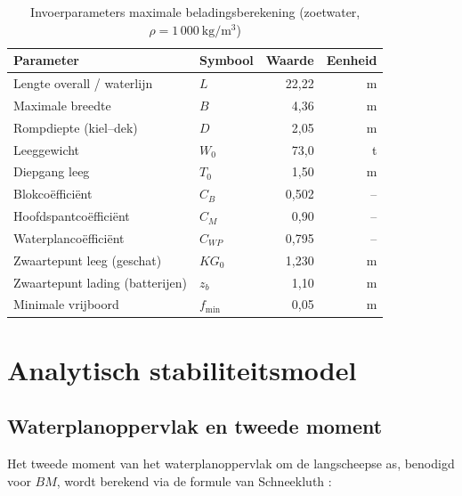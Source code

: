 \begin{table}[H]
    \centering
    \caption{Invoerparameters maximale beladingsberekening (zoetwater, $\rho = 1\,000\ \mathrm{kg/m^3}$)}
    \label{tab:invoer-maxbelading}
    \begin{tabular}{llrr}
        \toprule
        Parameter & Symbool & Waarde & Eenheid \\
        \midrule
        Lengte overall / waterlijn    & $L$                 & 22{,}22 & m    \\
        Maximale breedte              & $B$                 &  4{,}36 & m    \\
        Rompdiepte (kiel–dek)         & $D$                 &  2{,}05 & m    \\
        Leeggewicht                   & $W_0$               & 73{,}0  & t    \\
        Diepgang leeg                 & $T_0$               &  1{,}50 & m    \\
        Blokcoëfficiënt               & $C_B$               &  0{,}502& –    \\
        Hoofdspantcoëfficiënt         & $C_M$               &  0{,}90 & –    \\
        Waterplancoëfficiënt          & $C_{WP}$            &  0{,}795& –    \\
        Zwaartepunt leeg (geschat)    & $KG_0$              &  1{,}230& m    \\
        Zwaartepunt lading (batterijen)& $z_b$              &  1{,}10 & m    \\
        Minimale vrijboord            & $f_\mathrm{min}$    &  0{,}05 & m    \\
        \bottomrule
    \end{tabular}
\end{table}
 
\section{Analytisch stabiliteitsmodel}
\label{sec:analytisch-model}
 
\subsection{Waterplanoppervlak en tweede moment}
 
Het tweede moment van het waterplanoppervlak om de langscheepse as, benodigd voor $BM$,
wordt berekend via de formule van Schneekluth \cite{Schneekluth1998}:
 

